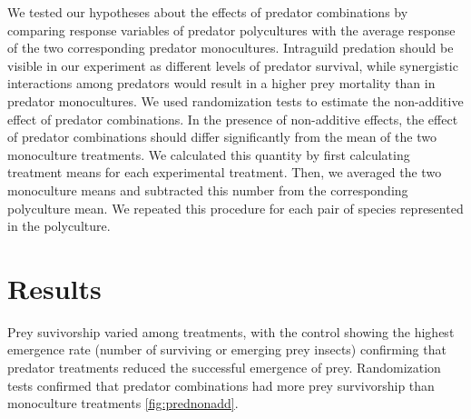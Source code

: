 \documentclass[10pt]{article}
\begin{document}
\begin{spacing}{2}
We tested our hypotheses about the effects of predator combinations by
comparing response variables of predator polycultures with the average
response of the two corresponding predator monocultures. Intraguild
predation should be visible in our experiment as different levels of
predator survival, while synergistic interactions among predators
would result in a higher prey mortality than in predator
monocultures. We used randomization tests to estimate the non-additive
effect of predator combinations.  In the presence of non-additive
effects, the effect of predator combinations should differ
significantly from the mean of the two monoculture treatments.  We
calculated this quantity by first calculating treatment means for each
experimental treatment.  Then, we averaged the two monoculture means
and subtracted this number from the corresponding polyculture mean.
We repeated this procedure for each pair of species represented in the
polyculture.

\section{Results}

Prey suvivorship varied among treatments, with the control showing the
highest emergence rate (number of surviving or emerging prey insects)
confirming that predator treatments reduced the successful emergence
of prey. Randomization tests confirmed that predator combinations had
more prey survivorship than monoculture treatments \ref{fig:prednonadd}.



\end{spacing}
\end{document}
